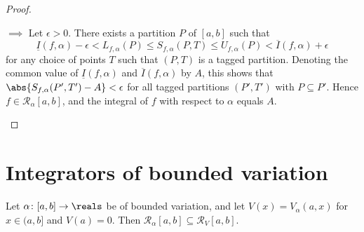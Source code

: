 \documentclass[article, a4paper, 11pt, oneside]{memoir}
\numberwithin{equation}{chapter}
\newcommand{\calR}{\mathcal{R}}
\begin{document}
\begin{proof}
\begin{proofsec}
    \item[\subcref{enum:upper-lower-integrals-equal} $\implies$ \subcref{enum:integrability}]
    Let $\epsilon > 0$. There exists a partition $P$ of $[a,b]$ such that
    \begin{equation*}
        \underline{I}(f,\alpha) - \epsilon
        < L_{f,\alpha}(P)
        \leq S_{f,\alpha}(P,T)
        \leq U_{f,\alpha}(P)
        < \overline{I}(f,\alpha) + \epsilon
    \end{equation*}
    for any choice of points $T$ such that $(P,T)$ is a tagged partition. Denoting the common value of $\underline{I}(f,\alpha)$ and $\overline{I}(f,\alpha)$ by $A$, this shows that $\abs{S_{f,\alpha}(P',T') - A} < \epsilon$ for all tagged partitions $(P',T')$ with $P \subseteq P'$. Hence $f \in \calR_\alpha[a,b]$, and the integral of $f$ with respect to $\alpha$ equals $A$.
\end{proofsec}
\end{proof}


\section{Integrators of bounded variation}

\begin{theorem}
    Let $\alpha \colon [a,b] \to \reals$ be of bounded variation, and let $V(x) = V_\alpha(a,x)$ for $x \in (a,b]$ and $V(a) = 0$. Then $\calR_\alpha[a,b] \subseteq \calR_V[a,b]$.
\end{theorem}
\end{document}

